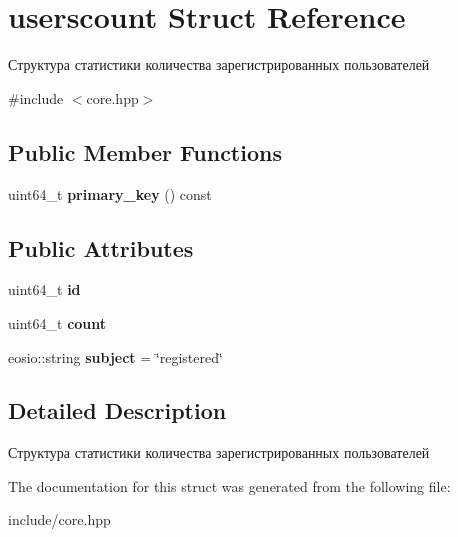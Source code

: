 \hypertarget{structuserscount}{}\section{userscount Struct Reference}
\label{structuserscount}


Структура статистики количества зарегистрированных пользователей  




{\ttfamily \#include $<$core.\+hpp$>$}

\subsection*{Public Member Functions}
\begin{DoxyCompactItemize}
\item 
\mbox{\label{structuserscount_ac14da811dfb4568a8b19fea2deb037ae}} 
uint64\+\_\+t {\bfseries primary\+\_\+key} () const
\end{DoxyCompactItemize}
\subsection*{Public Attributes}
\begin{DoxyCompactItemize}
\item 
\mbox{\label{structuserscount_ab26b8b359291bf8d9a27244559fb997f}} 
uint64\+\_\+t {\bfseries id}
\item 
\mbox{\label{structuserscount_a01c9875465eb8610009cc7030062ebd5}} 
uint64\+\_\+t {\bfseries count}
\item 
\mbox{\label{structuserscount_a54f7d250180247c6e8e48c70eb3b9515}} 
eosio\+::string {\bfseries subject} = \char`\"{}registered\char`\"{}
\end{DoxyCompactItemize}


\subsection{Detailed Description}
Структура статистики количества зарегистрированных пользователей 

The documentation for this struct was generated from the following file\+:\begin{DoxyCompactItemize}
\item 
include/core.\+hpp\end{DoxyCompactItemize}
